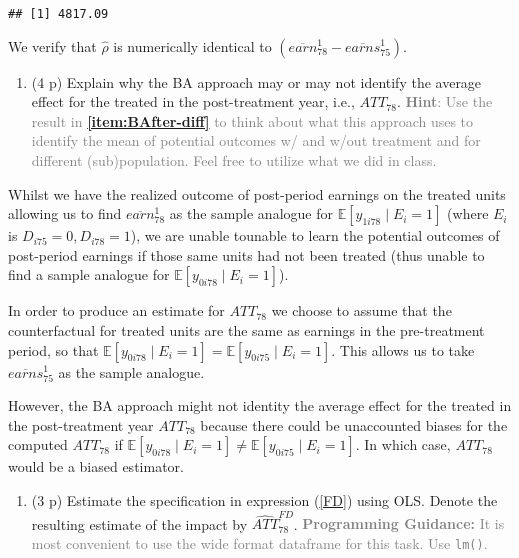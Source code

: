 \documentclass[
]{article}
\providecommand{\tightlist}{%
  \setlength{\itemsep}{0pt}\setlength{\parskip}{0pt}}
\begin{document}
\begin{verbatim}
## [1] 4817.09
\end{verbatim}

We verify that \(\hat{\rho}\) is numerically identical to
\(\left( \overline{earn}_{78}^{1}-\overline{earns}_{75}^{1}\right)\).

\begin{enumerate}
\def\labelenumi{\alph{enumi}.}
\setcounter{enumi}{4}
\tightlist
\item
  (4 p) Explain why the BA approach may or may not identify the average
  effect for the treated in the post-treatment year, i.e.,
  \({ATT}_{78}\).
  \textcolor{gray}{\textbf{Hint}: Use the result in \textbf{\ref{item:BAfter-diff}} to think about what this approach uses to identify the mean of potential outcomes w/ and w/out treatment and for different (sub)population. Feel free to utilize what we did in class.}
\end{enumerate}

Whilst we have the realized outcome of post-period earnings on the
treated units allowing us to find \(\overline{earn}_{78}^{1}\) as the
sample analogue for \(\mathbb{E}[y_{1i78} \mid E_i = 1]\) (where \(E_i\)
is \(D_{i75} = 0, D_{i78} = 1\)), we are unable tounable to learn the
potential outcomes of post-period earnings if those same units had not
been treated (thus unable to find a sample analogue for
\(\mathbb{E}[y_{0i78} \mid E_i = 1]\)).

In order to produce an estimate for \({ATT}_{78}\) we choose to assume
that the counterfactual for treated units are the same as earnings in
the pre-treatment period, so that
\(\mathbb{E}[y_{0i78} \mid E_i = 1] = \mathbb{E}[y_{0i75} \mid E_i = 1]\).
This allows us to take \(\overline{earns}_{75}^{1}\) as the sample
analogue.

However, the BA approach might not identity the average effect for the
treated in the post-treatment year \(ATT_{78}\) because there could be
unaccounted biases for the computed \(ATT_{78}\) if
\(\mathbb{E}[y_{0i78} \mid E_i = 1] \neq \mathbb{E}[y_{0i75} \mid E_i = 1]\).
In which case, \(ATT_{78}\) would be a biased estimator.

\begin{enumerate}
\def\labelenumi{\arabic{enumi}.}
\setcounter{enumi}{1}
\tightlist
\item
  (3 p) Estimate the specification in expression (\ref{FD}) using OLS.
  Denote the resulting estimate of the impact by
  \(\widehat{ATT}_{78}^{FD}\).
  \textcolor{gray}{\textbf{Programming Guidance:} It is most convenient to use the wide format dataframe for this task. Use \texttt{lm()}.}\label{item:fd}
\end{enumerate}
\end{document}
